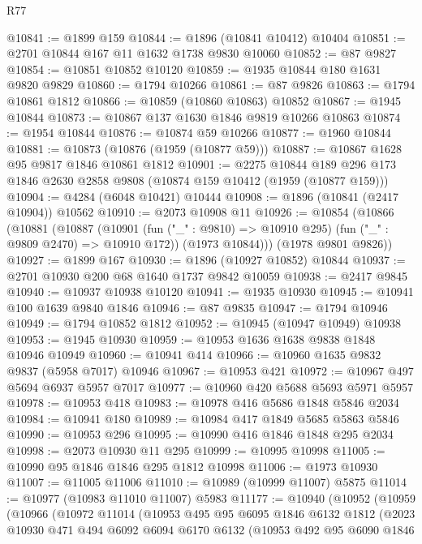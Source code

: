 \begin{lexlean}{R77}
\begin{coremodule}
@10841 := @1899 @159
@10844 := @1896 (@10841 @10412) @10404
@10851 := @2701 @10844 @167 @11 @1632 @1738 @9830 @10060
@10852 := @87 @9827
@10854 := @10851 @10852 @10120
@10859 := @1935 @10844 @180 @1631 @9820 @9829
@10860 := @1794 @10266
@10861 := @87 @9826
@10863 := @1794 @10861 @1812
@10866 := @10859 (@10860 @10863) @10852
@10867 := @1945 @10844
@10873 := @10867 @137 @1630 @1846 @9819 @10266 @10863
@10874 := @1954 @10844
@10876 := @10874 @59 @10266
@10877 := @1960 @10844
@10881 := @10873 (@10876 (@1959 (@10877 @59)))
@10887 := @10867 @1628 @95 @9817 @1846 @10861 @1812
@10901 := @2275
    @10844
    @189
    @296
    @173
    @1846
    @2630
    @2858
    @9808
    (@10874 @159 @10412 (@1959 (@10877 @159)))
@10904 := @4284 (@6048 @10421) @10444
@10908 := @1896 (@10841 (@2417 @10904)) @10562
@10910 := @2073 @10908 @11
@10926 := @10854
    (@10866
      (@10881
        (@10887
          (@10901 (fun ("_" : @9810) => @10910 @295) (fun ("_" : @9809 @2470) => @10910 @172))
          (@1973 @10844)))
      (@1978 @9801 @9826))
@10927 := @1899 @167
@10930 := @1896 (@10927 @10852) @10844
@10937 := @2701 @10930 @200 @68 @1640 @1737 @9842 @10059
@10938 := @2417 @9845
@10940 := @10937 @10938 @10120
@10941 := @1935 @10930
@10945 := @10941 @100 @1639 @9840 @1846
@10946 := @87 @9835
@10947 := @1794 @10946
@10949 := @1794 @10852 @1812
@10952 := @10945 (@10947 @10949) @10938
@10953 := @1945 @10930
@10959 := @10953 @1636 @1638 @9838 @1848 @10946 @10949
@10960 := @10941 @414
@10966 := @10960 @1635 @9832 @9837 (@5958 @7017) @10946
@10967 := @10953 @421
@10972 := @10967 @497 @5694 @6937 @5957 @7017
@10977 := @10960 @420 @5688 @5693 @5971 @5957
@10978 := @10953 @418
@10983 := @10978 @416 @5686 @1848 @5846 @2034
@10984 := @10941 @180
@10989 := @10984 @417 @1849 @5685 @5863 @5846
@10990 := @10953 @296
@10995 := @10990 @416 @1846 @1848 @295 @2034
@10998 := @2073 @10930 @11 @295
@10999 := @10995 @10998
@11005 := @10990 @95 @1846 @1846 @295 @1812 @10998
@11006 := @1973 @10930
@11007 := @11005 @11006
@11010 := @10989 (@10999 @11007) @5875
@11014 := @10977 (@10983 @11010 @11007) @5983
@11177 := @10940
    (@10952
      (@10959
        (@10966
          (@10972
            @11014
            (@10953
              @495
              @95
              @6095
              @1846
              @6132
              @1812
              (@2023
                @10930
                @471
                @494
                @6092
                @6094
                @6170
                @6132
                (@10953
                  @492
                  @95
                  @6090
                  @1846

\end{coremodule}
\end{lexlean}
